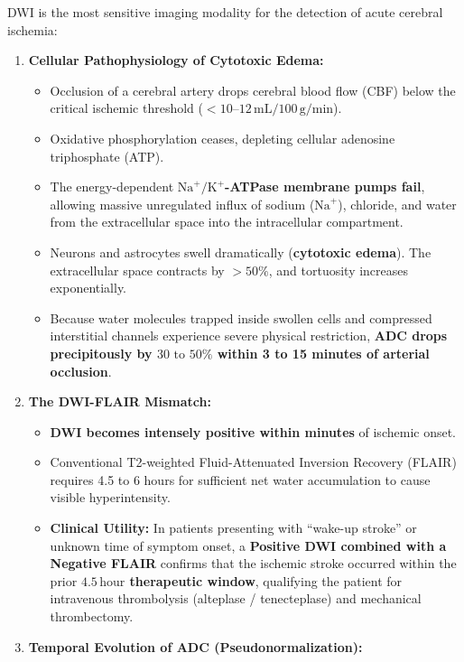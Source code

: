 \documentclass[11pt,a4paper]{article}
\begin{document}
DWI is the most sensitive imaging modality for the detection of acute cerebral ischemia:
\begin{enumerate}[leftmargin=*]
    \item \textbf{Cellular Pathophysiology of Cytotoxic Edema:}
    \begin{itemize}
        \item Occlusion of a cerebral artery drops cerebral blood flow (CBF) below the critical ischemic threshold ($< 10\text{--}12\,\text{mL} / 100\,\text{g/min}$).
        \item Oxidative phosphorylation ceases, depleting cellular adenosine triphosphate (ATP).
        \item The energy-dependent \textbf{$\text{Na}^+/\text{K}^+$-ATPase membrane pumps fail}, allowing massive unregulated influx of sodium ($\text{Na}^+$), chloride, and water from the extracellular space into the intracellular compartment.
        \item Neurons and astrocytes swell dramatically (\textbf{cytotoxic edema}). The extracellular space contracts by $> 50\%$, and tortuosity increases exponentially.
        \item Because water molecules trapped inside swollen cells and compressed interstitial channels experience severe physical restriction, \textbf{ADC drops precipitously by $30\text{ to }50\%$ within 3 to 15 minutes of arterial occlusion}.
    \end{itemize}
    \item \textbf{The DWI-FLAIR Mismatch:}
    \begin{itemize}
        \item \textbf{DWI becomes intensely positive within minutes} of ischemic onset.
        \item Conventional T2-weighted Fluid-Attenuated Inversion Recovery (FLAIR) requires 4.5 to 6 hours for sufficient net water accumulation to cause visible hyperintensity.
        \item \textbf{Clinical Utility:} In patients presenting with ``wake-up stroke'' or unknown time of symptom onset, a \textbf{Positive DWI combined with a Negative FLAIR} confirms that the ischemic stroke occurred within the prior \textbf{$4.5\,\text{hour}$ therapeutic window}, qualifying the patient for intravenous thrombolysis (alteplase / tenecteplase) and mechanical thrombectomy.
    \end{itemize}
    \item \textbf{Temporal Evolution of ADC (Pseudonormalization):}
    \begin{itemize}

\end{itemize}
\end{enumerate}
\end{document}
